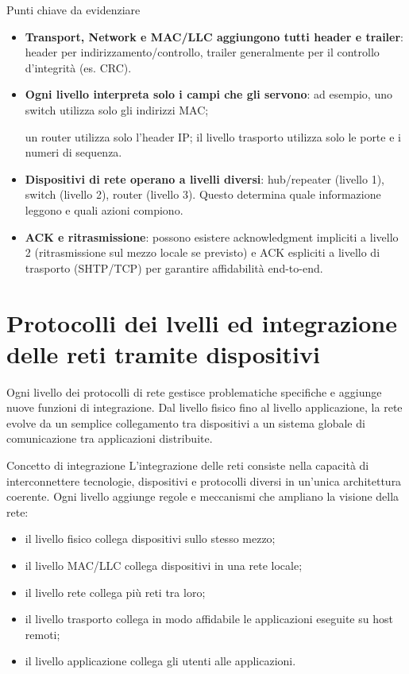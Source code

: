 \documentclass[a4paper,12pt]{report}
\begin{document}
\begin{notebox}{Punti chiave da evidenziare}
\begin{itemize}
\item \textbf{Transport, Network e MAC/LLC aggiungono tutti header e trailer}: header per indirizzamento/controllo, trailer generalmente per il controllo d’integrità (es. CRC).
\item \textbf{Ogni livello interpreta solo i campi che gli servono}: ad esempio, uno switch utilizza solo gli indirizzi MAC;

un router utilizza solo l’header IP; il livello trasporto utilizza solo le porte e i numeri di sequenza.
\item \textbf{Dispositivi di rete operano a livelli diversi}: hub/repeater (livello 1), switch (livello 2), router (livello 3). Questo determina quale informazione leggono e quali azioni compiono.
\item \textbf{ACK e ritrasmissione}: possono esistere acknowledgment impliciti a livello 2 (ritrasmissione sul mezzo locale se previsto) e ACK espliciti a livello di trasporto (SHTP/TCP) per garantire affidabilità end-to-end.
\end{itemize}
\end{notebox}
\vspace{3cm}



\newpage

\section{Protocolli dei lvelli ed integrazione delle reti tramite dispositivi}

Ogni livello dei protocolli di rete gestisce problematiche specifiche e aggiunge nuove funzioni di integrazione.
Dal livello fisico fino al livello applicazione, la rete evolve da un semplice collegamento tra dispositivi a un sistema globale di comunicazione tra applicazioni distribuite.

\begin{defbox}{Concetto di integrazione}
L'integrazione delle reti consiste nella capacità di interconnettere tecnologie, dispositivi e protocolli diversi in un’unica architettura coerente.
Ogni livello aggiunge regole e meccanismi che ampliano la visione della rete:
\begin{itemize}
\item il livello fisico collega dispositivi sullo stesso mezzo;
\item il livello MAC/LLC collega dispositivi in una rete locale;
\item il livello rete collega più reti tra loro;
\item il livello trasporto collega in modo affidabile le applicazioni eseguite su host remoti;
\item il livello applicazione collega gli utenti alle applicazioni.
\end{itemize}
\end{defbox}
\end{document}
